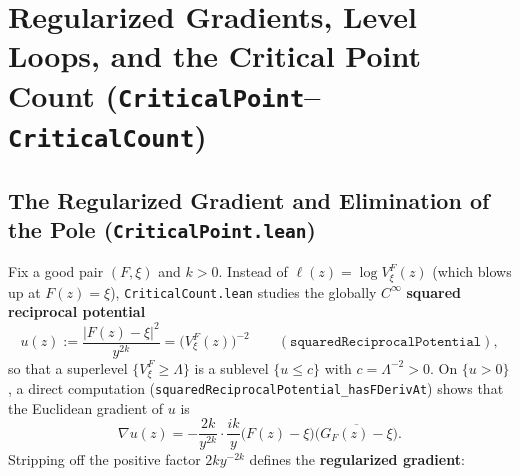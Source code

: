 \documentclass[11pt,reqno]{amsart}
\theoremstyle{definition}
\begin{document}
\section{Regularized Gradients, Level Loops, and the Critical Point Count (\texttt{CriticalPoint}--\texttt{CriticalCount})}

\subsection{The Regularized Gradient and Elimination of the Pole (\texttt{CriticalPoint.lean})}

Fix a good pair $(F,\xi)$ and $k > 0$. Instead of $\ell(z) = \log V_\xi^F(z)$ (which blows up at $F(z)=\xi$), \texttt{CriticalCount.lean} studies the globally $C^\infty$ \textbf{squared reciprocal potential}
\[
u(z) := \frac{|F(z)-\xi|^2}{y^{2k}} = \bigl(V_\xi^F(z)\bigr)^{-2} \qquad (\texttt{squaredReciprocalPotential}),
\]
so that a superlevel $\{V_\xi^F \ge \Lambda\}$ is a sublevel $\{u \le c\}$ with $c = \Lambda^{-2} > 0$. On $\{u > 0\}$, a direct computation (\texttt{squaredReciprocalPotential\_hasFDerivAt}) shows that the Euclidean gradient of $u$ is
\[
\nabla u(z) = -\frac{2k}{y^{2k}}\cdot \frac{ik}{y}\bigl(F(z)-\xi\bigr)\overline{\bigl(G_F(z)-\xi\bigr)}.
\]
Stripping off the positive factor $2k y^{-2k}$ defines the \textbf{regularized gradient}:
\end{document}
